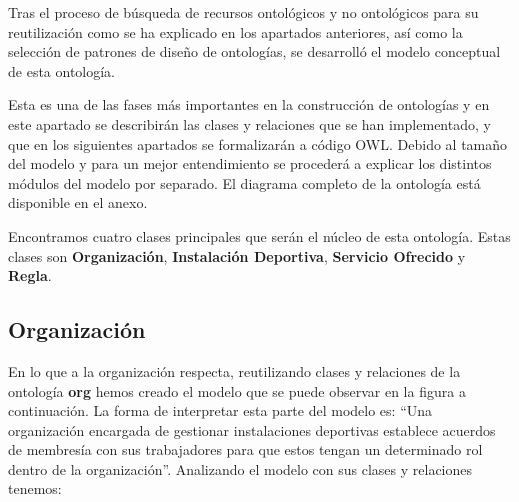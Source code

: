 \documentclass[a4paper,12pt]{article}
\begin{document}
	Tras el proceso de búsqueda de recursos ontológicos y no ontológicos para su reutilización como se ha explicado en los apartados anteriores, así como la selección de patrones de diseño de ontologías, se desarrolló el modelo conceptual de esta ontología. 
	
	Esta es una de las fases más importantes en la construcción de ontologías y en este apartado se describirán las clases y relaciones que se han implementado, y que en los siguientes apartados se formalizarán a código OWL. Debido al tamaño del modelo y para un mejor entendimiento se procederá a explicar los distintos módulos del modelo por separado. El diagrama completo de la ontología está disponible en el anexo.
	
	Encontramos cuatro clases principales que serán el núcleo de esta ontología. Estas clases son \textbf{Organización}, \textbf{Instalación Deportiva}, \textbf{Servicio Ofrecido} y \textbf{Regla}.
	
	
	\subsection{Organización}
	
	En lo que a la organización respecta, reutilizando clases y relaciones de la ontología \textbf{org} hemos creado el modelo que se puede observar en la figura a continuación. La forma de interpretar esta parte del modelo es: “Una organización encargada de gestionar instalaciones deportivas establece acuerdos de membresía con sus trabajadores para que estos tengan un determinado rol dentro de la organización”. Analizando el modelo con sus clases y relaciones tenemos:
	
\end{document}
